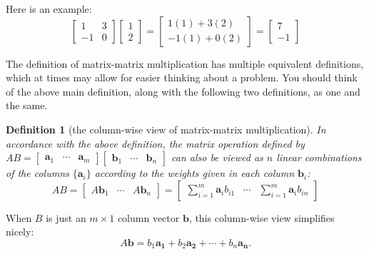 \documentclass[draft,12pt]{report}
\newtheorem{definition}{Definition}
\renewcommand{\vec}[1]{\mathbf{#1}}
\begin{document}
Here is an example:
\[ \begin{bmatrix} 1 & 3 \\
    -1 & 0
\end{bmatrix} \begin{bmatrix} 1 \\ 2 \end{bmatrix} = \begin{bmatrix} 1(1) + 3(2) \\ -1(1) + 0(2) \end{bmatrix} = \begin{bmatrix} 7 \\ -1 \end{bmatrix} \]

The definition of matrix-matrix multiplication has multiple equivalent definitions, which at times may allow for easier thinking about a problem. You should think of the above main definition, along with the following two definitions, as one and the same.

\begin{definition}[the column-wise view of matrix-matrix multiplication]
    In accordance with the above definition, the matrix operation defined by $AB = \begin{bmatrix} \vec{a}_1 & \cdots & \vec{a}_m \end{bmatrix}\begin{bmatrix} \vec{b}_1 & \cdots & \vec{b}_n \end{bmatrix}$ can also be viewed as $n$ linear combinations of the columns $\{ \vec{a}_i \}$ according to the weights given in each column $\vec{b}_i$:
    \[ AB = \begin{bmatrix} A\vec{b}_1 & \cdots & A\vec{b}_n \end{bmatrix} = \begin{bmatrix} \sum_{i = 1}^m \vec{a}_i b_{i1} & \cdots & \sum_{i = 1}^m \vec{a}_i b_{in} \end{bmatrix} \]
\end{definition}
\noindent
When $B$ is just an $m \times 1$ column vector $\vec{b}$, this column-wise view simplifies nicely:
\[ A\vec{b} = b_1\vec{a_1} + b_2\vec{a_2} + \cdots + b_n\vec{a_n}. \]
\end{document}
